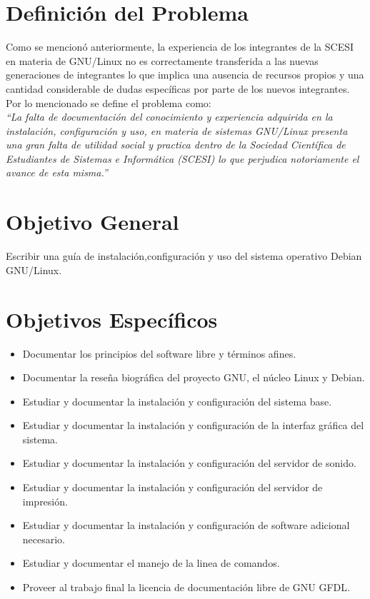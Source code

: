 \documentclass[letterpaper,11pt]{article}
\begin{document}
\section{Definición del Problema}
Como se mencionó anteriormente, la experiencia de los integrantes de la SCESI en materia de GNU/Linux no es correctamente transferida a las nuevas generaciones de integrantes lo que implica una ausencia de recursos propios y una cantidad considerable de dudas específicas por parte de los nuevos integrantes.\\

Por lo mencionado se define el problema como:\\

\emph{“La falta de documentación del conocimiento y experiencia adquirida en la instalación, configuración y uso, en materia de sistemas GNU/Linux presenta una gran falta de utilidad social y practica dentro de la Sociedad Científica de Estudiantes de Sistemas e Informática (SCESI) lo que perjudica notoriamente el avance de esta misma.”}

\section{Objetivo General}
Escribir una guía de instalación,configuración y uso del sistema operativo Debian GNU/Linux.

\section{Objetivos Específicos}
\begin{itemize}
\item Documentar los principios del software libre y términos afines. 
\item Documentar la reseña biográfica del proyecto GNU, el núcleo Linux y Debian.
\item Estudiar y documentar la instalación y configuración del sistema base.
\item Estudiar y documentar la instalación y configuración de la interfaz gráfica del sistema.
\item Estudiar y documentar la instalación y configuración del servidor de sonido.
\item Estudiar y documentar la instalación y configuración del servidor de impresión.
\item Estudiar y documentar la instalación y configuración de software adicional necesario.
\item Estudiar y documentar el manejo de la linea de comandos.
\item Proveer al trabajo final la licencia de documentación libre de GNU GFDL. 
\end{itemize}
\end{document}
